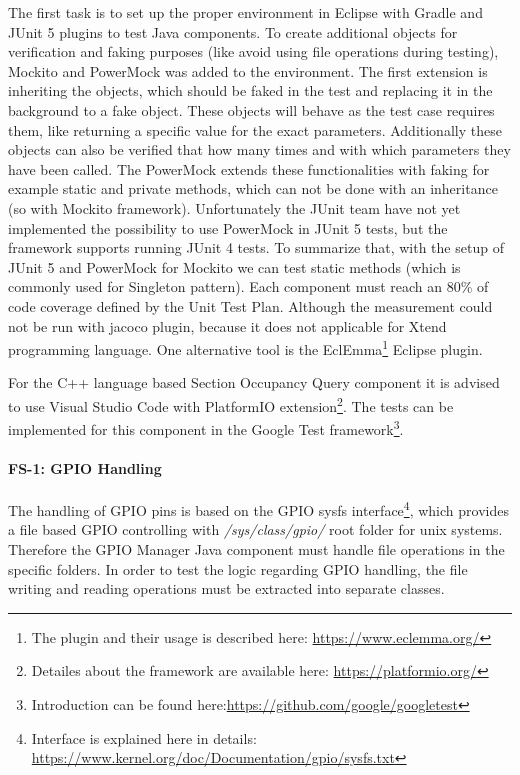 The first task is to set up the proper environment in Eclipse with Gradle and JUnit 5 \cite{JUnit5} plugins to test Java components. To create additional objects for verification and faking purposes (like avoid using file operations during testing), Mockito \cite{Mockito} and PowerMock \cite{PowerMock} was added to the environment. The first extension is inheriting the objects, which should be faked in the test and replacing it in the background to a fake object. These objects will behave as the test case requires them, like returning a specific value for the exact parameters. Additionally these objects can also be verified that how many times and with which parameters they have been called. The PowerMock extends these functionalities with faking for example static and private methods, which can not be done with an inheritance (so with Mockito framework). Unfortunately the JUnit team have not yet implemented the possibility to use PowerMock in JUnit 5 tests, but the framework supports running JUnit 4 tests. To summarize that, with the setup of JUnit 5 and PowerMock for Mockito we can test static methods (which is commonly used for Singleton pattern). Each component must reach an 80\% of code coverage defined by the Unit Test Plan. Although the measurement could not be run with jacoco plugin, because it does not applicable for Xtend programming language. One alternative tool is the EclEmma\footnote{The plugin and their usage is described here: \url{https://www.eclemma.org/}} Eclipse plugin.

For the C++ language based Section Occupancy Query component it is advised to use Visual Studio Code with PlatformIO extension\footnote{Detailes about the framework are available here: \url{https://platformio.org/}}. The tests can be implemented for this component in the Google Test framework\footnote{Introduction can be found here:\url{https://github.com/google/googletest}}.

\paragraph{FS-1: GPIO Handling} The handling of GPIO pins is based on the GPIO sysfs interface\footnote{Interface is explained here in details: \url{https://www.kernel.org/doc/Documentation/gpio/sysfs.txt}}, which provides a file based GPIO controlling with \textit{/sys/class/gpio/} root folder for unix systems. Therefore the GPIO Manager Java component must handle file operations in the specific folders. In order to test the logic regarding GPIO handling, the file writing and reading operations must be extracted into separate classes.

